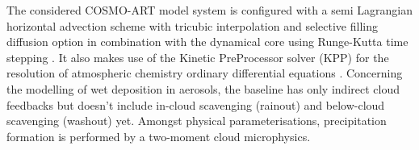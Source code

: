 The  considered  COSMO-ART model  system  is  configured  with a  semi
Lagrangian horizontal advection scheme with tricubic interpolation and
selective filling  diffusion option in combination  with the dynamical
core  using Runge-Kutta  time  stepping \citep{COSMO-PartI-2011}.   It
also  makes use  of  the  Kinetic PreProcessor  solver  (KPP) for  the
resolution  of atmospheric  chemistry ordinary  differential equations
\citep{Damian-2002}.   Concerning the modelling  of wet  deposition in
aerosols, the  baseline has only indirect cloud  feedbacks but doesn't
include  in-cloud  scavenging  (rainout)  and  below-cloud  scavenging
(washout)  yet.   Amongst  physical  parameterisations,  precipitation
formation is performed by a two-moment cloud microphysics.
